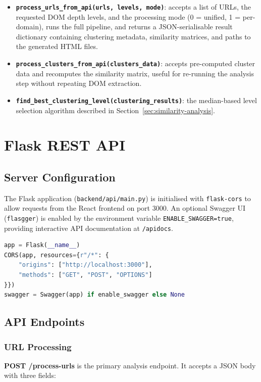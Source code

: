 \begin{itemize}
    \item \textbf{\texttt{process\_urls\_from\_api(urls, levels, mode)}}: accepts a list of URLs, the requested DOM depth levels, and the processing mode (0 = unified, 1 = per-domain), runs the full pipeline, and returns a JSON-serialisable result dictionary containing clustering metadata, similarity matrices, and paths to the generated HTML files.
    \item \textbf{\texttt{process\_clusters\_from\_api(clusters\_data)}}: accepts pre-computed cluster data and recomputes the similarity matrix, useful for re-running the analysis step without repeating DOM extraction.
    \item \textbf{\texttt{find\_best\_clustering\_level(clustering\_results)}}: the median-based level selection algorithm described in Section~\ref{sec:similarity-analysis}.
\end{itemize}

\section{Flask REST API}
\label{sec:api-implementation}

\subsection{Server Configuration}

The Flask application (\texttt{backend/api/main.py}) is initialised with \texttt{flask-cors} to allow requests from the React frontend on port 3000. An optional Swagger UI (\texttt{flasgger}) is enabled by the environment variable \texttt{ENABLE\_SWAGGER=true}, providing interactive API documentation at \texttt{/apidocs}.

\begin{lstlisting}[language=Python, caption=Flask application initialisation]
app = Flask(__name__)
CORS(app, resources={r"/*": {
    "origins": ["http://localhost:3000"],
    "methods": ["GET", "POST", "OPTIONS"]
}})
swagger = Swagger(app) if enable_swagger else None
\end{lstlisting}

\subsection{API Endpoints}

\subsubsection{URL Processing}
\textbf{POST /process-urls} is the primary analysis endpoint. It accepts a JSON body with three fields:

